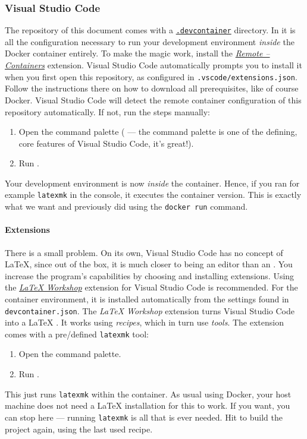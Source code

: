 \subsubsection{Visual Studio Code}

The repository of this document comes with a \href{https://github.com/microsoft/vscode-dev-containers}{\texttt{.devcontainer}} directory.
In it is all the configuration necessary to run your development environment \emph{inside} the Docker container entirely.
To make the magic work, install the \href{https://marketplace.visualstudio.com/items?itemName=ms-vscode-remote.remote-containers}{\emph{Remote -- Containers}} extension.
Visual Studio Code automatically prompts you to install it when you first open this repository, as configured in \texttt{.vscode/extensions.json}.
Follow the instructions there on how to download all prerequisites, like of course Docker.
Visual Studio Code will detect the remote container configuration of this repository automatically.
If not, run the steps manually:
\begin{enumerate}
    \item Open the command palette ( --- the command palette is one of the defining, core features of Visual Studio Code, it's great!).
    \item Run .
\end{enumerate}
Your development environment is now \emph{inside} the container.
Hence, if you ran for example \texttt{latexmk} in the console, it executes the container version.
This is exactly what we want and previously did using the \texttt{docker run} command.

\paragraph{Extensions}
There is a small problem.
On its own, Visual Studio Code has no concept of \LaTeX{}, since out of the box, it is much closer to being an editor than an .
You increase the program's capabilities by choosing and installing extensions.
Using the \href{https://marketplace.visualstudio.com/items?itemName=James-Yu.latex-workshop}{\emph{LaTeX Workshop}} extension for Visual Studio Code is recommended.
For the container environment, it is installed automatically from the settings found in \texttt{devcontainer.json}.
The \emph{LaTeX Workshop} extension turns Visual Studio Code into a \LaTeX{} .
It works using \emph{recipes}, which in turn use \emph{tools}.
The extension comes with a pre\-/defined \texttt{latexmk} tool:
\begin{enumerate}
    \item Open the command palette.
    \item Run .
\end{enumerate}
This just runs \texttt{latexmk} within the container.
As usual using Docker, your host machine does not need a \LaTeX{} installation for this to work.
If you want, you can stop here --- running \texttt{latexmk} is all that is ever needed.
Hit  to build the project again, using the last used recipe.

